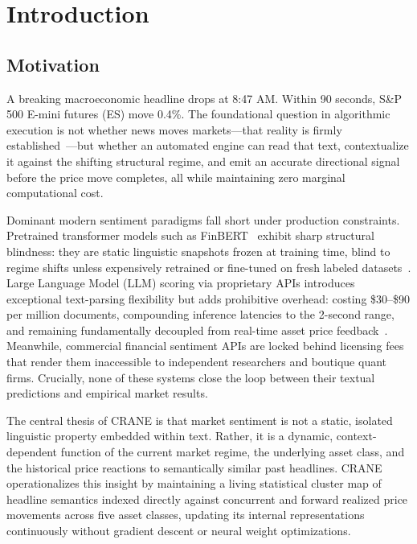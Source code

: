 \section{Introduction}

\subsection{Motivation}

A breaking macroeconomic headline drops at 8:47 AM. Within 90 seconds, S\&P 500 E-mini futures (ES) move 0.4\%. The foundational question in algorithmic execution is not whether news moves markets---that reality is firmly established~\cite{fama1970efficient}---but whether an automated engine can read that text, contextualize it against the shifting structural regime, and emit an accurate directional signal before the price move completes, all while maintaining zero marginal computational cost.

Dominant modern sentiment paradigms fall short under production constraints. Pretrained transformer models such as FinBERT~\cite{finbert2020} exhibit sharp structural blindness: they are static linguistic snapshots frozen at training time, blind to regime shifts unless expensively retrained or fine-tuned on fresh labeled datasets~\cite{cristescu2025finbert}. Large Language Model (LLM) scoring via proprietary APIs introduces exceptional text-parsing flexibility but adds prohibitive overhead: costing \$30--\$90 per million documents, compounding inference latencies to the 2-second range, and remaining fundamentally decoupled from real-time asset price feedback~\cite{kirtac2025llmfinance}. Meanwhile, commercial financial sentiment APIs are locked behind licensing fees that render them inaccessible to independent researchers and boutique quant firms. Crucially, none of these systems close the loop between their textual predictions and empirical market results.

The central thesis of CRANE is that market sentiment is not a static, isolated linguistic property embedded within text. Rather, it is a dynamic, context-dependent function of the current market regime, the underlying asset class, and the historical price reactions to semantically similar past headlines. CRANE operationalizes this insight by maintaining a living statistical cluster map of headline semantics indexed directly against concurrent and forward realized price movements across five asset classes, updating its internal representations continuously without gradient descent or neural weight optimizations.

